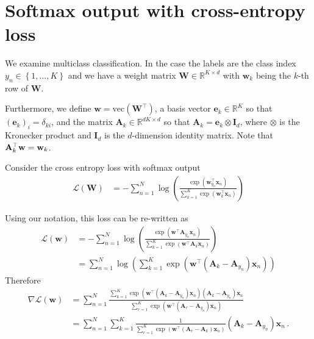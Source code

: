 \documentclass[twoside,11pt,english]{article}
\begin{document}
\section{Softmax output with cross-entropy loss\label{sec:Softmax-output-with-cross-entropy-loss}}

We examine multiclass classification. In the case the labels are the
class index $y_{n}\in\left\{ 1,\dots,K\right\} $ and we have a weight
matrix $\mathbf{W}\in\mathbb{R}^{K\times d}$ with $\mathbf{w}_{k}$
being the $k$-th row of $\mathbf{W}$.

Furthermore, we define $\mathbf{w}=\mathrm{vec}$$\left(\mathbf{W}^{\top}\right)$,
a basis vector $\mathbf{e}_{k}\in\mathbb{R}^{K}$ so that$\left(\mathbf{e}_{k}\right)_{i}=\delta_{ki}$,
and the matrix $\mathbf{A}_{k}\in\mathbb{R}^{dK\times d}$ so that
$\mathbf{A}_{k}=\mathbf{e}_{k}\otimes\mathbf{I}_{d}$, where $\otimes$
is the Kronecker product and $\mathbf{I}_{d}$ is the $d$-dimension
identity matrix. Note that $\mathbf{A}_{k}^{\top}\mathbf{w}=\mathbf{w}_{k}$.

Consider the cross entropy loss with softmax output 
\begin{align*}
\mathcal{L}\left(\mathbf{W}\right) & =-\sum_{n=1}^{N}\log\left(\frac{\exp\left(\mathbf{w}_{y_{n}}^{\top}\mathbf{x}_{n}\right)}{\sum_{k=1}^{K}\exp\left(\mathbf{w}_{k}^{\top}\mathbf{x}_{n}\right)}\right)
\end{align*}

Using our notation, this loss can be re-written as 
\begin{align}
\mathcal{L}\left(\mathbf{w}\right) & =-\sum_{n=1}^{N}\log\left(\frac{\exp\left(\mathbf{w}^{\top}\mathbf{A}_{y_{n}}\mathbf{x}_{n}\right)}{\sum_{k=1}^{K}\exp\left(\mathbf{w}^{\top}\mathbf{A}_{k}\mathbf{x}_{n}\right)}\right)\nonumber \\
 & =\sum_{n=1}^{N}\log\left(\sum_{k=1}^{K}\exp\left(\mathbf{w}^{\top}\left(\mathbf{A}_{k}-\mathbf{A}_{y_{n}}\right)\mathbf{x}_{n}\right)\right)\label{eq: cross-entropy loss}
\end{align}
Therefore 
\begin{align*}
\nabla\mathcal{L}\left(\mathbf{w}\right) & =\sum_{n=1}^{N}\frac{\sum_{k=1}^{K}\exp\left(\mathbf{w}^{\top}\left(\mathbf{A}_{k}-\mathbf{A}_{y_{n}}\right)\mathbf{x}_{n}\right)\left(\mathbf{A}_{k}-\mathbf{A}_{y_{n}}\right)\mathbf{x}_{n}}{\sum_{r=1}^{K}\exp\left(\mathbf{w}^{\top}\left(\mathbf{A}_{r}-\mathbf{A}_{y_{n}}\right)\mathbf{x}_{n}\right)}\\
 & =\sum_{n=1}^{N}\sum_{k=1}^{K}\frac{1}{\sum_{r=1}^{K}\exp\left(\mathbf{w}^{\top}\left(\mathbf{A}_{r}-\mathbf{A}_{k}\right)\mathbf{x}_{n}\right)}\left(\mathbf{A}_{k}-\mathbf{A}_{y_{n}}\right)\mathbf{x}_{n}\,.
\end{align*}
\end{document}
